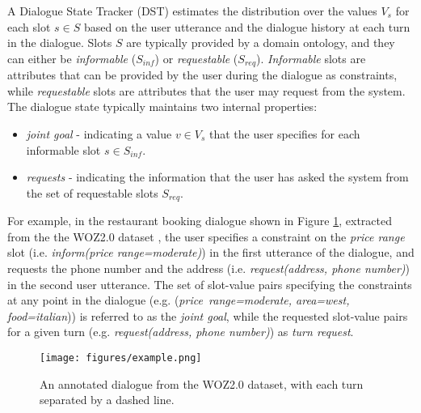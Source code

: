 \documentclass{article}
\begin{document}
A Dialogue State Tracker (DST) estimates the distribution over the values $V_s$ for each slot $s \in S$ based on the user utterance and the dialogue history at each turn in the dialogue.
Slots $S$ are typically provided by a domain ontology, and they can either be \textit{informable} ($S_{inf}$) or \textit{requestable} ($S_{req}$).
\textit{Informable} slots are attributes that can be provided by the user during the dialogue as constraints, while  \textit{requestable} slots are attributes that the user may request from the system.
The dialogue state typically maintains two internal properties: 
\begin{itemize}
    \item \textit{joint goal} - indicating a value $v \in V_s$ that the user specifies for each informable slot $s \in S_{inf}$.
    \item \textit{requests} - indicating the information that the user has asked the system from the set of requestable slots $S_{req}$.
\end{itemize}
For example, in the restaurant booking dialogue shown in Figure \ref{fig:example}, extracted from the the WOZ2.0 dataset \cite{NBT}, the user  specifies a constraint on the \textit{price range} slot (i.e. \textit{inform(price range=moderate)}) in the first utterance of the dialogue, and requests the phone number and the address (i.e. \textit{request(address, phone number)}) in the second user utterance.
The set of slot-value pairs specifying the constraints at any point in the dialogue (e.g. (\textit{price\ range=moderate, area=west, food=italian})) is referred to as the \textit{joint goal}, while the requested slot-value pairs for a given turn (e.g. \textit{request(address, phone number)}) as \textit{turn request}.

\begin{figure}
    \centering
    \texttt{[image: figures/example.png]}
    \caption{An annotated dialogue from the WOZ2.0 dataset, with each turn separated by a dashed line.}
    \label{fig:example}
\end{figure}
\end{document}

